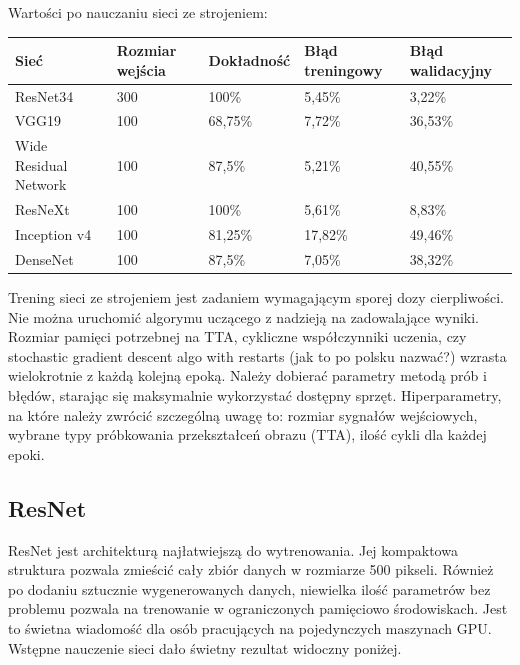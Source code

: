 \documentclass[12pt,a4paper,twoside,titlepage,openright]{book}
\begin{document}
\begin{itemize}
\begin{itemize}
Wartości po nauczaniu sieci ze strojeniem:
\begin{center}
    \begin{tabular}{ | l | l | l | l | l |}
    \hline
    Sieć & Rozmiar wejścia & Dokładność & Błąd treningowy & Błąd walidacyjny \\ \hline
    ResNet34 & 300 & 100\% & 5,45\% & 3,22\% \\ \hline
    VGG19 & 100 & 68,75\% & 7,72\% & 36,53\% \\ \hline
    Wide Residual Network & 100 & 87,5\% & 5,21\% & 40,55\% \\ \hline    
	ResNeXt & 100 & 100\% & 5,61\% & 8,83\% \\ \hline
    Inception v4 & 100 & 81,25\% & 17,82\% & 49,46\% \\ \hline
    DenseNet & 100 & 87,5\% & 7,05\% & 38,32\%\\ \hline
    \end{tabular}
\end{center}

Trening sieci ze strojeniem jest zadaniem wymagającym sporej dozy cierpliwości. Nie można uruchomić algorymu uczącego z nadzieją na zadowalające wyniki. Rozmiar pamięci potrzebnej na TTA, cykliczne współczynniki uczenia, czy stochastic gradient descent algo with restarts (jak to po polsku nazwać?) wzrasta wielokrotnie z każdą kolejną epoką. Należy dobierać parametry metodą prób i błędów, starając się maksymalnie wykorzystać dostępny sprzęt. Hiperparametry, na które należy zwrócić szczególną uwagę to: rozmiar sygnałów wejściowych, wybrane typy próbkowania przekształceń obrazu (TTA), ilość cykli dla każdej epoki.

\subsection{ResNet}
ResNet jest architekturą najłatwiejszą do wytrenowania. Jej kompaktowa struktura pozwala zmieścić cały zbiór danych w rozmiarze 500 pikseli. Również po dodaniu sztucznie wygenerowanych danych, niewielka ilość parametrów bez problemu pozwala na trenowanie w ograniczonych pamięciowo środowiskach. Jest to świetna wiadomość dla osób pracujących na pojedynczych maszynach GPU. Wstępne nauczenie sieci dało świetny rezultat widoczny poniżej.


\end{itemize}
\end{itemize}
\end{document}
